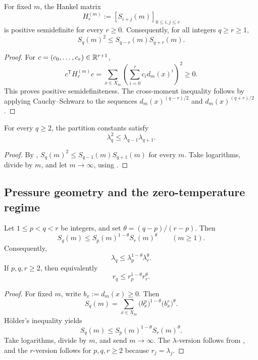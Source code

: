 \begin{proposition}
\label{prop:hankel-psd}
For fixed \(m\), the Hankel matrix
\[
  H_r^{(m)}:=[S_{i+j}(m)]_{0\le i,j\le r}
\]
is positive semidefinite for every \(r\ge 0\).  Consequently, for all integers
\(q\ge r\ge 1\),
\[
  S_q(m)^2\le S_{q-r}(m)S_{q+r}(m).
\]
\end{proposition}

\begin{proof}
For \(c=(c_0,\dots,c_r)\in\mathbb{R}^{r+1}\),
\[
  c^{\mathsf T}H_r^{(m)}c
  =
  \sum_{x\in X_m}\left(\sum_{i=0}^r c_i d_m(x)^i\right)^2\ge 0.
\]
This proves positive semidefiniteness.  The cross-moment inequality follows by
applying Cauchy--Schwarz to the sequences
\(d_m(x)^{(q-r)/2}\) and \(d_m(x)^{(q+r)/2}\).
\end{proof}

\begin{corollary}
\label{cor:cross-q-logconvex}
For every \(q\ge 2\), the partition constants satisfy
\[
  \lambda_q^2\le \lambda_{q-1}\lambda_{q+1}.
\]
\end{corollary}

\begin{proof}
By ,
\(S_q(m)^2\le S_{q-1}(m)S_{q+1}(m)\) for every \(m\).  Take logarithms, divide
by \(m\), and let \(m\to\infty\), using .
\end{proof}

\subsection{Pressure geometry and the zero-temperature regime}

\begin{theorem}
\label{thm:global-pressure-convexity}
Let \(1\le p<q<r\) be integers, and set \(\theta=(q-p)/(r-p)\).  Then
\[
  S_q(m)\le S_p(m)^{1-\theta}S_r(m)^\theta
  \qquad (m\ge 1).
\]
Consequently,
\[
  \lambda_q\le \lambda_p^{1-\theta}\lambda_r^\theta.
\]
If \(p,q,r\ge 2\), then equivalently
\[
  r_q\le r_p^{1-\theta}r_r^\theta.
\]
\end{theorem}

\begin{proof}
For fixed \(m\), write \(b_x:=d_m(x)\ge 0\).  Then
\[
  S_q(m)
  =
  \sum_{x\in X_m}
  \bigl(b_x^p\bigr)^{1-\theta}\bigl(b_x^r\bigr)^\theta.
\]
H\"older's inequality yields
\[
  S_q(m)\le S_p(m)^{1-\theta}S_r(m)^\theta.
\]
Take logarithms, divide by \(m\), and send \(m\to\infty\).  The
\(\lambda\)-version follows from , and the
\(r\)-version follows for \(p,q,r\ge 2\) because \(r_j=\lambda_j\).
\end{proof}

